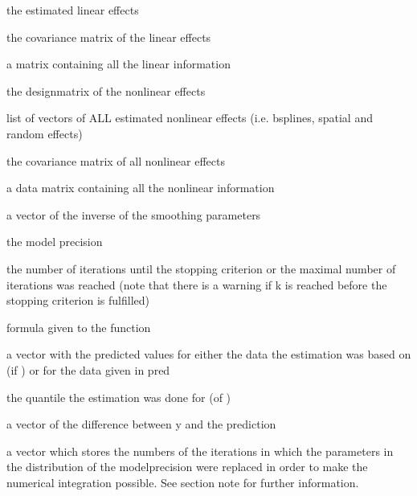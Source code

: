 \documentclass[a4paper]{book}
\begin{document}
\begin{Value}


\begin{ldescription}
\item[\code{beta }] the estimated linear effects
\item[\code{sig\_bet}] the covariance matrix of the linear effects
\item[\code{Xlinear}] a matrix containing all the linear information
\item[\code{Z}] the designmatrix of the nonlinear effects
\item[\code{gamma}] list of vectors of ALL estimated nonlinear effects (i.e. bsplines, spatial and random effects)
\item[\code{sig\_gam}] the covariance matrix of all nonlinear effects
\item[\code{Xnonlinear}] a data matrix containing all the nonlinear information
\item[\code{tau\_inv}] a vector of the inverse of the smoothing parameters
\item[\code{delta}] the model precision
\item[\code{i}] the number of iterations until the stopping criterion or the maximal number of iterations was reached (note that there is a warning if k is reached before the stopping criterion is fulfilled)
\item[\code{call}] formula given to the function
\item[\code{prediction}] a vector with the predicted values for either the data the estimation was based on (if ) or for the data given in pred
\item[\code{tau}] the quantile the estimation was done for (of )
\item[\code{residuals}] a vector of the difference between y and the prediction
\item[\code{replace}] a vector which stores the numbers of the iterations in which the parameters in the distribution of the modelprecision were replaced in order to make the numerical integration possible. See section note for further information.

\end{ldescription}


\end{Value}
%
\end{document}
